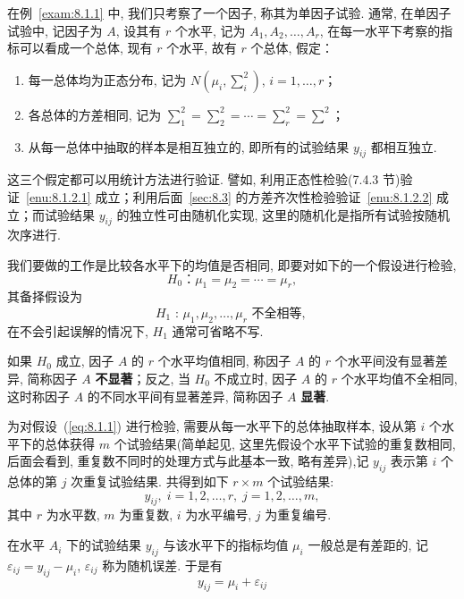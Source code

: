 在例~\ref{exam:8.1.1} 中, 我们只考察了一个因子, 称其为单因子试验. 通常, 在单因子试验中, 记因子为 $A$, 设其有 $r$ 个水平, 记为 $A_1,A_2,\ldots,A_r$, 在每一水平下考察的指标可以看成一个总体, 现有 $r$ 个水平, 故有 $r$ 个总体, 假定：

\begin{enumerate}
  \item 每一总体均为正态分布, 记为 $N(\mu_i, \sum_i^2)$, $i=1,\ldots,r$；\label{enu:8.1.2.1}
  \item 各总体的方差相同, 记为 $\sum_1^2 = \sum_2^2=\cdots=\sum_r^2=\sum^2$；\label{enu:8.1.2.2}
  \item 从每一总体中抽取的样本是相互独立的, 即所有的试验结果 $y_{ij}$ 都相互独立. 
\end{enumerate}

这三个假定都可以用统计方法进行验证. 譬如, 利用正态性检验(7.4.3 节)验证~\ref{enu:8.1.2.1} 成立；利用后面~\ref{sec:8.3} 的方差齐次性检验验证~\ref{enu:8.1.2.2} 成立；而试验结果 $y_{ij}$ 的独立性可由随机化实现, 这里的随机化是指所有试验按随机次序进行. 

我们要做的工作是比较各水平下的均值是否相同, 即要对如下的一个假设进行检验, 
\begin{equation}
  H_0 \text{：} \mu_1 = \mu_2 = \cdots = \mu_r,\label{eq:8.1.1}
\end{equation}
其备择假设为
\begin{equation*}
  H_1 \text{ : } \mu_1,\mu_2,\ldots,\mu_r \text{ 不全相等, }
\end{equation*}
在不会引起误解的情况下, $H_1$ 通常可省略不写. 

如果 $H_0$ 成立, 因子 $A$ 的 $r$ 个水平均值相同, 称因子 $A$ 的 $r$ 个水平间没有显著差异, 简称因子 $A$ \textbf{不显著}；反之, 当 $H_0$ 不成立时, 因子 $A$ 的 $r$ 个水平均值不全相同, 这时称因子 $A$ 的不同水平间有显著差异, 简称因子 $A$ \textbf{显著}. 

为对假设~(\ref{eq:8.1.1}) 进行检验, 需要从每一水平下的总体抽取样本, 设从第 $i$ 个水平下的总体获得 $m$ 个试验结果(简单起见, 这里先假设个水平下试验的重复数相同, 后面会看到, 重复数不同时的处理方式与此基本一致, 略有差异),记 $y_{ij}$ 表示第 $i$ 个总体的第 $j$ 次重复试验结果. 共得到如下 $r \times m$ 个试验结果:
\begin{equation*}
  y_{ij}, \; i=1,2,\ldots,r, \; j = 1,2,\ldots,m,
\end{equation*}
其中 $r$ 为水平数, $m$ 为重复数, $i$ 为水平编号, $j$ 为重复编号.

在水平 $A_i$ 下的试验结果 $y_{ij}$ 与该水平下的指标均值 $\mu_i$ 一般总是有差距的, 记 $\varepsilon_{ij} = y_{ij} - \mu_i$, $\varepsilon_{ij}$ 称为随机误差. 于是有
\begin{equation}
  \label{eq:8.1.2}
  y_{ij} = \mu_i + \varepsilon_{ij}
\end{equation}

